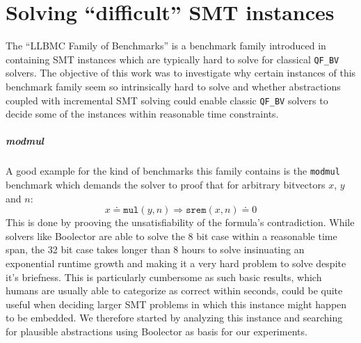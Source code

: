 \chapter{Solving \enquote{difficult} SMT instances}
\label{ch:solving_hard_smt}
\label{sec:solving_hard_smt:llbmc_benchmarks}
The \enquote{LLBMC Family of Benchmarks} is a benchmark family introduced in \cite{sc2017-proceedings} containing SMT instances which are typically hard to solve for classical \texttt{QF\_BV} solvers. The objective of this work was to investigate why certain instances of this benchmark family seem so intrinsically hard to solve and whether abstractions coupled with incremental SMT solving could enable classic \texttt{QF\_BV} solvers to decide some of the instances within reasonable time constraints.

\paragraph{modmul}
A good example for the kind of benchmarks this family contains is the \texttt{modmul} benchmark which demands the solver to proof that for arbitrary bitvectors $x$, $y$ and $n$:
\[
x \doteq \texttt{mul}\left(y,n\right) \Rightarrow \texttt{srem}\left(x,n\right) \doteq 0
\]
This is done by prooving the unsatisfiability of the formula's contradiction.
While solvers like Boolector are able to solve the 8 bit case within a reasonable time span, the 32 bit case takes longer than 8 hours to solve insinuating an exponential runtime growth and making it a very hard problem to solve despite it's briefness. This is particularly cumbersome as such basic results, which humans are usually able to categorize as correct within seconds, could be quite useful when deciding larger SMT problems in which this instance might happen to be embedded. We therefore started by analyzing this instance and searching for plausible abstractions using Boolector as basis for our experiments.

